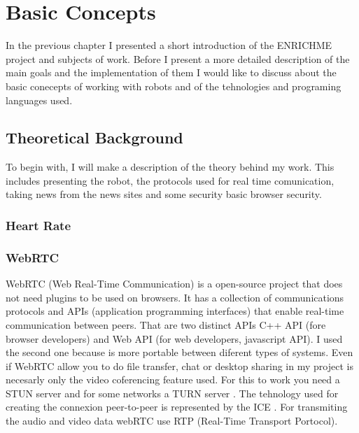 \chapter{Basic Concepts}
\label{chapter:basic}
In the previous chapter I presented a short introduction of the ENRICHME project and subjects of work.
Before I present a more detailed description of the main goals and the implementation of them I would like
to discuss about the basic conecepts of working with robots and of the tehnologies and programing languages used.


\section{Theoretical Background}
\label{sec:tbkg}

To begin with, I will make a description of the theory behind my work. This includes
presenting the robot, the protocols used for real time comunication, taking news from the news sites
and some security basic browser security.

\subsection{Heart Rate}
\label{sub-sec:tbkg-heartrate}



\subsection{WebRTC}
\label{sub-sec:tbkg-webRTC}
WebRTC (Web Real-Time Communication) \cite{bergkvist2012webrtc} is a open-source project
that does not need plugins to be used on browsers. It has a collection of communications
protocols and APIs (application programming interfaces) that enable real-time
communication between peers.
That are two distinct APIs C++ API (fore browser developers) and Web API
(for web developers, javascript API).
I used the second one because is more portable
between diferent types of systems.
Even if WebRTC allow you to do file transfer, chat or desktop sharing 
in my project is necesarly only the video coferencing feature used.
For this to work you need a STUN server \cite{mahy2003network} and 
for some networks a TURN server \cite{mahy2010traversal}.
The tehnology used for creating the connexion peer-to-peer is represented
by the ICE \cite{rosenberg2010interactive}.
For transmiting the audio and video data webRTC use RTP (Real-Time Transport Portocol).


